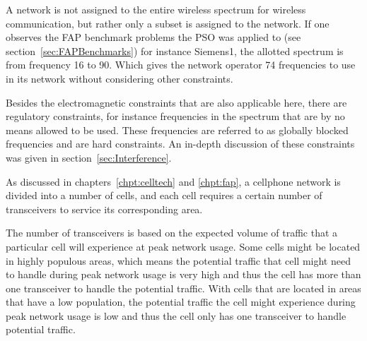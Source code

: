 A network is not assigned to the entire wireless spectrum for wireless communication, but rather only a subset is assigned to the network. If one observes the \gls{FAP} benchmark problems the \gls{PSO} was applied to (see section~\ref{sec:FAPBenchmarks}) for instance Siemens1, the allotted spectrum is from frequency 16 to 90. Which gives the network operator 74 frequencies to use in its network without considering other constraints. 

Besides the electromagnetic constraints that are also applicable here, there are regulatory constraints, for instance frequencies in the spectrum that are by no means allowed to be used. These frequencies are referred to as globally blocked frequencies and are hard constraints. An in-depth discussion of these constraints was given in section~\ref{sec:Interference}.

As discussed in chapters~\ref{chpt:celltech} and \ref{chpt:fap}, a cellphone network is divided into a number of cells, and each cell requires a certain number of transceivers to service its corresponding area. 

The number of transceivers is based on the expected volume of traffic that a particular cell will experience at peak network usage. Some cells might be located in highly populous areas, which means the potential traffic that cell might need to handle during peak network usage is very high and thus the cell has more than one transceiver to handle the potential traffic. With cells that are located in areas that have a low population, the potential traffic the cell might experience during peak network usage is low and thus the cell only has one transceiver to handle potential traffic.


